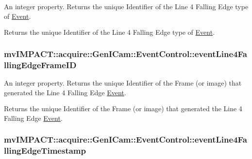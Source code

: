 An integer property. Returns the unique Identifier of the Line 4 Falling Edge type of \hyperlink{classmv_i_m_p_a_c_t_1_1acquire_1_1_event}{Event}. 

Returns the unique Identifier of the Line 4 Falling Edge type of \hyperlink{classmv_i_m_p_a_c_t_1_1acquire_1_1_event}{Event}. \hypertarget{classmv_i_m_p_a_c_t_1_1acquire_1_1_gen_i_cam_1_1_event_control_a15a04c66a279665702a5f7ee5eab1d48}{
\subsubsection[{event\+Line4\+Falling\+Edge\+Frame\+I\+D}]{ mv\+I\+M\+P\+A\+C\+T\+::acquire\+::\+Gen\+I\+Cam\+::\+Event\+Control\+::event\+Line4\+Falling\+Edge\+Frame\+I\+D}}\label{classmv_i_m_p_a_c_t_1_1acquire_1_1_gen_i_cam_1_1_event_control_a15a04c66a279665702a5f7ee5eab1d48}


An integer property. Returns the unique Identifier of the Frame (or image) that generated the Line 4 Falling Edge \hyperlink{classmv_i_m_p_a_c_t_1_1acquire_1_1_event}{Event}. 

Returns the unique Identifier of the Frame (or image) that generated the Line 4 Falling Edge \hyperlink{classmv_i_m_p_a_c_t_1_1acquire_1_1_event}{Event}. \hypertarget{classmv_i_m_p_a_c_t_1_1acquire_1_1_gen_i_cam_1_1_event_control_a7f2d3b3bfc818335326cf57559487809}{
\subsubsection[{event\+Line4\+Falling\+Edge\+Timestamp}]{ mv\+I\+M\+P\+A\+C\+T\+::acquire\+::\+Gen\+I\+Cam\+::\+Event\+Control\+::event\+Line4\+Falling\+Edge\+Timestamp}}\label{classmv_i_m_p_a_c_t_1_1acquire_1_1_gen_i_cam_1_1_event_control_a7f2d3b3bfc818335326cf57559487809}


